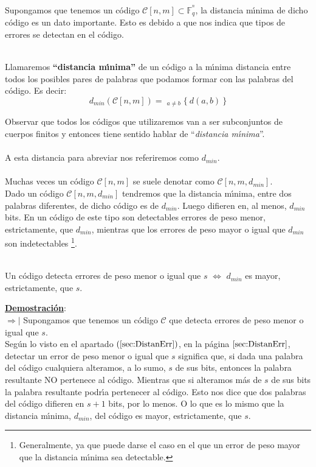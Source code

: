 Supongamos que tenemos un c\'odigo $\mathcal{C}[n,m]\subset \mathbb{F}^{^n}_q$,
la distancia m\'{\i}nima de dicho c\'odigo es un dato importante. Esto es 
debido a que nos indica que tipos de errores se detectan en el c\'odigo.
\begin{definicion}
\ \\
Llamaremos \textbf{``distancia m\'{\i}nima''} de un c\'odigo a la m\'{\i}nima
distancia entre todos los posibles pares de palabras que podamos formar con
las palabras del c\'odigo. Es decir:
\begin{displaymath}
d_{min} (\mathcal{C}[n,m]) = \mathop{\min_{a,b\in \mathcal{C}[n,m]}}_{a\neq b}
\{ \ d(a,b)\ \}
\end{displaymath}
\end{definicion}
Observar que todos los c\'odigos que utilizaremos van a ser subconjuntos de
cuerpos finitos y entonces tiene sentido hablar de ``\emph{distancia
m\'{\i}nima}''.\\ \\
%
A esta distancia para abreviar nos referiremos como $d_{min}$.\\ \\
%
Muchas veces un c\'odigo $\mathcal{C}[n,m]$ se suele denotar como
$\mathcal{C}[n,m,d_{min}]$.\\

Dado un c\'odigo $\mathcal{C}[n,m,d_{min}]$ tendremos que la distancia
m\'{\i}nima, entre dos palabras diferentes, de dicho c\'odigo es de $d_{min}$.
Luego difieren en, al menos, $d_{min}$ bits. En un c\'odigo de este tipo son
detectables errores de peso menor, estrictamente, que $d_{min}$, mientras que
los errores de peso mayor o igual que $d_{min}$ son indetectables%
\footnote{Generalmente, ya
que puede darse el caso en el que un error de peso mayor que la distancia
m\'{\i}nima sea detectable.}.
%
\newpage
%
\begin{teorema}\label{the:Deteccion}
\ \\
Un c\'odigo detecta errores de peso menor o igual que $s$ $\Longleftrightarrow$
$d_{min}$ es mayor, estrictamente, que $s$.
\end{teorema}
\underline{\textbf{Demostraci\'on}}:\\

$\Rightarrow |$ Supongamos que tenemos un c\'odigo $\mathcal{C}$ que detecta
errores de peso menor o igual que $s$.\\

Seg\'un lo visto en el apartado $(\ref{sec:DistanErr})$, en la p\'agina
$\pageref{sec:DistanErr}$, detectar un error de peso menor o igual que $s$
significa que, si dada una palabra del c\'odigo cualquiera alteramos, a
lo sumo, $s$ de sus bits, entonces la palabra resultante NO pertenece al
c\'odigo. Mientras que si alteramos m\'as de $s$ de sus bits la palabra
resultante podr\'{\i}a pertenecer al c\'odigo. Esto nos dice que dos palabras
del c\'odigo difieren en $s+1$ bits, por lo menos. O lo que es lo mismo que
la distancia m\'{\i}nima, $d_{min}$, del c\'odigo es mayor, estrictamente, que
$s$.\\

